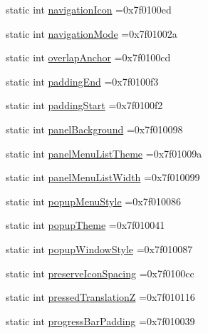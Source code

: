 \begin{DoxyCompactItemize}
\item 
static int \hyperlink{classandroid_1_1support_1_1v7_1_1recyclerview_1_1R_1_1attr_a86dd81e542ac0cbd9366c0cae3d11360}{navigation\+Icon} =0x7f0100ed
\item 
static int \hyperlink{classandroid_1_1support_1_1v7_1_1recyclerview_1_1R_1_1attr_a344a41483c3675f6ce55b22dc11e55b5}{navigation\+Mode} =0x7f01002a
\item 
static int \hyperlink{classandroid_1_1support_1_1v7_1_1recyclerview_1_1R_1_1attr_ad6479f9b668a3b7c7ebec2a088507af4}{overlap\+Anchor} =0x7f0100cd
\item 
static int \hyperlink{classandroid_1_1support_1_1v7_1_1recyclerview_1_1R_1_1attr_a76234d9d13a4b9568c499a59c276cdb0}{padding\+End} =0x7f0100f3
\item 
static int \hyperlink{classandroid_1_1support_1_1v7_1_1recyclerview_1_1R_1_1attr_ad30de1b7ee28e604be1e93448720355f}{padding\+Start} =0x7f0100f2
\item 
static int \hyperlink{classandroid_1_1support_1_1v7_1_1recyclerview_1_1R_1_1attr_aa7e0d76fef1777b589738c359bb16900}{panel\+Background} =0x7f010098
\item 
static int \hyperlink{classandroid_1_1support_1_1v7_1_1recyclerview_1_1R_1_1attr_ae18026cb484b3e5676e172ed20b58ce0}{panel\+Menu\+List\+Theme} =0x7f01009a
\item 
static int \hyperlink{classandroid_1_1support_1_1v7_1_1recyclerview_1_1R_1_1attr_aab0ef3b4e13bf76b22288dd8334e2115}{panel\+Menu\+List\+Width} =0x7f010099
\item 
static int \hyperlink{classandroid_1_1support_1_1v7_1_1recyclerview_1_1R_1_1attr_a7c76c1fbc081d9dcd3fe90305c7cb351}{popup\+Menu\+Style} =0x7f010086
\item 
static int \hyperlink{classandroid_1_1support_1_1v7_1_1recyclerview_1_1R_1_1attr_af26e858c5bcefd37bb6149e8c47e86cf}{popup\+Theme} =0x7f010041
\item 
static int \hyperlink{classandroid_1_1support_1_1v7_1_1recyclerview_1_1R_1_1attr_a531d6ff7772368ed77ab012f444f2bc1}{popup\+Window\+Style} =0x7f010087
\item 
static int \hyperlink{classandroid_1_1support_1_1v7_1_1recyclerview_1_1R_1_1attr_af0782475eb2c9808c420f204688a15b4}{preserve\+Icon\+Spacing} =0x7f0100cc
\item 
static int \hyperlink{classandroid_1_1support_1_1v7_1_1recyclerview_1_1R_1_1attr_a300ece3326bc93e497d8202b00071740}{pressed\+TranslationZ} =0x7f010116
\item 
static int \hyperlink{classandroid_1_1support_1_1v7_1_1recyclerview_1_1R_1_1attr_a1eddb072ecdbfcdc4d0cf8c9c41999ed}{progress\+Bar\+Padding} =0x7f010039

\end{DoxyCompactItemize}
